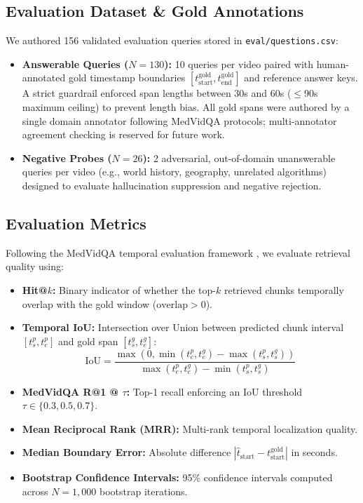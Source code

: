 \documentclass[conference]{IEEEtran}
\begin{document}
\subsection{Evaluation Dataset \& Gold Annotations}
We authored 156 validated evaluation queries stored in \texttt{eval/questions.csv}:
\begin{itemize}
    \item \textbf{Answerable Queries ($N=130$):} 10 queries per video paired with human-annotated gold timestamp boundaries $[t_{\text{start}}^{\text{gold}}, t_{\text{end}}^{\text{gold}}]$ and reference answer keys. A strict guardrail enforced span lengths between 30s and 60s ($\le$90s maximum ceiling) to prevent length bias. All gold spans were authored by a single domain annotator following MedVidQA protocols; multi-annotator agreement checking is reserved for future work.
    \item \textbf{Negative Probes ($N=26$):} 2 adversarial, out-of-domain unanswerable queries per video (e.g., world history, geography, unrelated algorithms) designed to evaluate hallucination suppression and negative rejection.
\end{itemize}

\subsection{Evaluation Metrics}
Following the MedVidQA temporal evaluation framework \cite{gupta2022medvidqa}, we evaluate retrieval quality using:
\begin{itemize}
    \item \textbf{Hit@$k$:} Binary indicator of whether the top-$k$ retrieved chunks temporally overlap with the gold window ($\text{overlap} > 0$).
    \item \textbf{Temporal IoU:} Intersection over Union between predicted chunk interval $[t_{s}^p, t_{e}^p]$ and gold span $[t_{s}^g, t_{e}^g]$:
    \begin{equation}
    \text{IoU} = \frac{\max(0, \min(t_{e}^p, t_{e}^g) - \max(t_{s}^p, t_{s}^g))}{\max(t_{e}^p, t_{e}^g) - \min(t_{s}^p, t_{s}^g)}
    \end{equation}
    \item \textbf{MedVidQA R@1 @ $\tau$:} Top-1 recall enforcing an IoU threshold $\tau \in \{0.3, 0.5, 0.7\}$.
    \item \textbf{Mean Reciprocal Rank (MRR):} Multi-rank temporal localization quality.
    \item \textbf{Median Boundary Error:} Absolute difference $|\hat{t}_{\text{start}} - t_{\text{start}}^{\text{gold}}|$ in seconds.
    \item \textbf{Bootstrap Confidence Intervals:} 95\% confidence intervals computed across $N=1,000$ bootstrap iterations.
\end{itemize}
\end{document}
